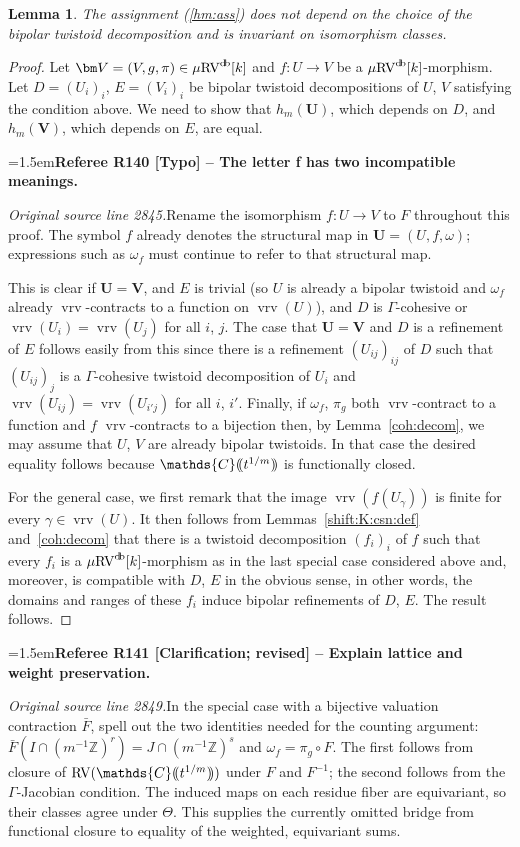 \documentclass[12pt]{amsart}
\newcommand{\RefereeRemark}[4]{%
  \par\medskip\begingroup\normalfont\small\color{RefereePurple}%
  \emergencystretch=1.5em\noindent\textbf{Referee R#1 [#2] -- #3.}\par\nobreak\noindent #4\par
  \endgroup\medskip
}
\theoremstyle{plain}
\newtheorem{lem}[thm]{Lemma}
\theoremstyle{definition}
\theoremstyle{remark}
\numberwithin{equation}{section}
\theoremstyle{plain}
\newcommand{\RV}{\textup{RV}}
\newcommand{\Z}{\mathds{Z}}
\newcommand{\C}{\mathds{C}}
\newcommand{\0}{\emptyset}
\newcommand{\dpar}[1]{%
   (\mkern-4mu (#1 )\mkern-4mu )}
\newcommand{\fun}{\longrightarrow}
\newcommand{\mgRV}{{\mu}{\RV}}
\DeclareMathOperator{\vrv}{vrv}
\DeclareMathOperator{\db}{d \! b}
\begin{document}
\begin{lem}\label{muhat:section}
The  assignment (\ref{hm:ass}) does not depend on the choice of the bipolar twistoid decomposition and is invariant on isomorphism classes.
\end{lem}
\begin{proof}
Let $\bm V = (V, g, \pi) \in \mgRV^{\db}[k]$  and $f : U \fun V$ be a $\mgRV^{\db}[k]$-morphism. Let $D = (U_i)_i$, $E = (V_i)_i$ be bipolar twistoid decompositions of $U$, $V$ satisfying the condition above. We need to show that $h_m(\bm U)$, which depends on $D$, and $h_m(\bm V)$, which depends on $E$, are  equal.

\RefereeRemark{140}{Typo}{The letter f has two incompatible meanings}{%
\textit{Original source line 2845.}\quad Rename the isomorphism $f:U\fun V$ to $F$ throughout this proof. The symbol $f$ already denotes the structural map in $\bm U=(U,f,\omega)$; expressions such as $\omega_f$ must continue to refer to that structural map.
}
This is clear if $\bm U = \bm V$,  and $E$ is trivial (so $U$ is already a bipolar twistoid and $\omega_f$ already $\vrv$-contracts to a function on $\vrv(U)$), and $D$ is $\Gamma$-cohesive or $\vrv(U_i) = \vrv(U_j)$ for all $i$, $j$. The case that $\bm U = \bm V$ and $D$ is a refinement of $E$  follows easily from this since there is a refinement $(U_{ij})_{ij}$ of $D$ such that $(U_{ij})_{j}$ is a $\Gamma$-cohesive twistoid decomposition of $U_i$  and $\vrv(U_{ij}) = \vrv(U_{i'j})$ for all $i$, $i'$. Finally,  if $\omega_f$, $\pi_g$ both $\vrv$-contract to a function and $f$ $\vrv$-contracts to a bijection then, by Lemma~\ref{coh:decom}, we may assume that $U$, $V$ are already bipolar twistoids. In that case the desired equality follows because $\C \dpar{ t^{1/m} }$ is functionally closed.

For the general case, we first remark that the image $\vrv(f(U_\gamma))$ is finite for every $\gamma \in \vrv(U)$. It then follows from Lemmas~\ref{shift:K:csn:def} and~\ref{coh:decom} that there is a twistoid decomposition $(f_i)_i$ of $f$ such that every $f_i$ is a $\mgRV^{\db}[k]$-morphism as in the last special case considered above and, moreover, is compatible with $D$, $E$ in the obvious sense, in other words, the domains and ranges of these $f_i$ induce bipolar refinements of $D$, $E$.  The result follows.
\end{proof}

\RefereeRemark{141}{Clarification; revised}{Explain lattice and weight preservation}{%
\textit{Original source line 2849.}\quad In the special case with a bijective valuation contraction $\bar F$, spell out the two identities needed for the counting argument: $\bar F(I\cap(m^{-1}\Z)^r)=J\cap(m^{-1}\Z)^s$ and $\omega_f=\pi_g\circ F$. The first follows from closure of $\RV(\C\dpar{t^{1/m}})$ under $F$ and $F^{-1}$; the second follows from the $\Gamma$-Jacobian condition. The induced maps on each residue fiber are equivariant, so their classes agree under $\Theta$. This supplies the currently omitted bridge from functional closure to equality of the weighted, equivariant sums.
}
\end{document}

